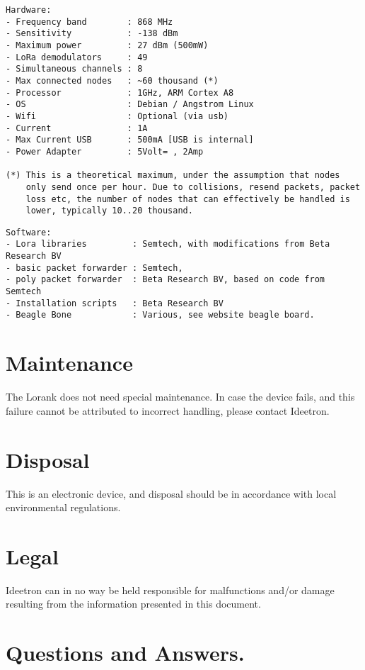 \documentclass[12pt]{article}
\begin{document}
\begin{verbatim}
Hardware:
- Frequency band        : 868 MHz
- Sensitivity           : -138 dBm
- Maximum power         : 27 dBm (500mW)
- LoRa demodulators     : 49
- Simultaneous channels : 8
- Max connected nodes   : ~60 thousand (*)
- Processor             : 1GHz, ARM Cortex A8
- OS                    : Debian / Angstrom Linux
- Wifi                  : Optional (via usb)
- Current               : 1A
- Max Current USB       : 500mA [USB is internal]
- Power Adapter         : 5Volt= , 2Amp 

(*) This is a theoretical maximum, under the assumption that nodes
    only send once per hour. Due to collisions, resend packets, packet
    loss etc, the number of nodes that can effectively be handled is
    lower, typically 10..20 thousand. 
\end{verbatim}

\begin{verbatim}
Software:
- Lora libraries         : Semtech, with modifications from Beta Research BV
- basic packet forwarder : Semtech, 
- poly packet forwarder  : Beta Research BV, based on code from Semtech
- Installation scripts   : Beta Research BV
- Beagle Bone            : Various, see website beagle board.
\end{verbatim}

\section{Maintenance}
The Lorank does not need special maintenance. In case the device fails,
and this failure cannot be attributed to incorrect handling, please
contact Ideetron.
 
\section{Disposal}
This is an electronic device, and disposal should be in accordance with
local environmental regulations.

\section{Legal}
Ideetron can in no way be held responsible for
malfunctions and/or damage resulting from the
information presented in this document. 


\section{Questions and Answers.}
\end{document}
